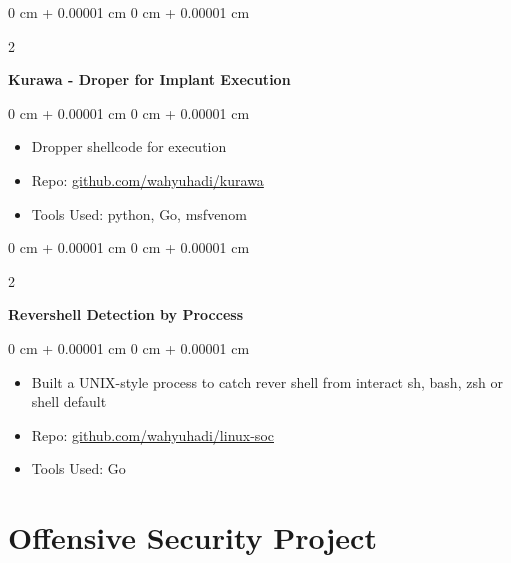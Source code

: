 \documentclass[10pt, letterpaper]{article}
\newenvironment{highlights}{
    \begin{itemize}[
        topsep=0.10 cm,
        parsep=0.10 cm,
        partopsep=0pt,
        itemsep=0pt,
        leftmargin=0 cm + 10pt
    ]
}{
    \end{itemize}
} %
\newenvironment{onecolentry}{
    \begin{adjustwidth}{
        0 cm + 0.00001 cm
    }{
        0 cm + 0.00001 cm
    }
}{
    \end{adjustwidth}
} %
\newenvironment{twocolentry}[2][]{
    \onecolentry
    \def\secondColumn{#2}
    \setcolumnwidth{\fill, 4.5 cm}
    \begin{paracol}{2}
}{
    \switchcolumn \raggedleft \secondColumn
    \end{paracol}
    \endonecolentry
} %
\begin{document}
	\begin{twocolentry}{
			
		}
		\textbf{Kurawa - Droper for Implant Execution }\end{twocolentry}
	
	\vspace{0.10 cm}
	\begin{onecolentry}
		\begin{highlights}
			\item Dropper shellcode for execution 
			\item Repo: \href{https://github.com/wahyuhadi/kurawa}{github.com/wahyuhadi/kurawa} 
			\item Tools Used: python, Go, msfvenom
		\end{highlights}
	\end{onecolentry}

        \vspace{0.2 cm}

        \begin{twocolentry}{
            
        }
            \textbf{Revershell Detection by Proccess}\end{twocolentry}

        \vspace{0.10 cm}
        \begin{onecolentry}
            \begin{highlights}
                \item Built a UNIX-style process to catch rever shell from interact sh, bash, zsh or shell default
                \item Repo: \href{https://github.com/wahyuhadi/linux-soc}{github.com/wahyuhadi/linux-soc}
                \item Tools Used: Go
            \end{highlights}
        \end{onecolentry}


	\section{Offensive Security Project}
		  \vspace{0.2 cm}
\end{document}
